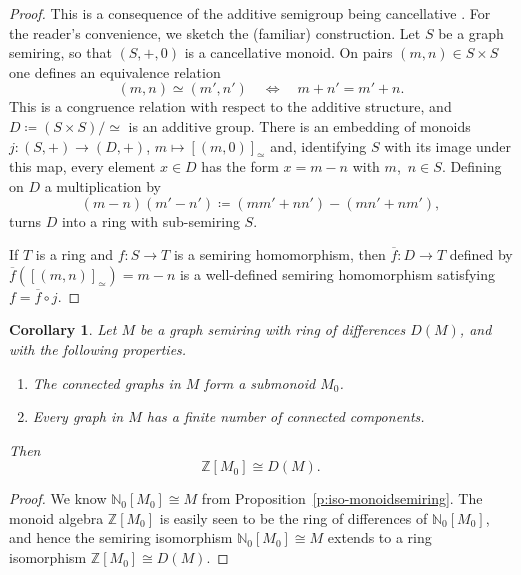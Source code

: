 \documentclass{amsart}
\theoremstyle{plain}
\newtheorem{corollary}[thm]{Corollary}
\theoremstyle{definition}
\newcommand{\bN}{\mathbb N}
\newcommand{\bZ}{\mathbb Z}
\newcommand{\diff}{D}
\begin{document}
\begin{proof}
  This is a consequence of the additive semigroup being cancellative \cite[Theorem II.5.11]{hebisch-weinert98}.
  For the reader's convenience, we sketch the (familiar) construction.
  Let $S$ be a graph semiring, so that $(S,+,0)$ is a cancellative monoid.
  On pairs $(m,n) \in S \times S$ one defines an equivalence relation
  \[
    (m,n) \simeq (m',n') \quad\Leftrightarrow\quad m + n' = m' + n.
  \]
  This is a congruence relation with respect to the additive structure, and $D \coloneqq (S \times S)/\!\simeq$ is an additive group.
  There is an embedding of monoids $j\colon (S,+) \rightarrow (D,+)$, $m \mapsto [(m,0)]_{\simeq}$ and, identifying $S$ with its image under this map, every element $x \in D$ has the form $x = m - n$ with $m$,~$n \in S$.
  Defining on $D$ a multiplication by
  \[
    (m - n)(m' - n') \coloneqq (mm' + nn') - (mn' + nm'),
  \]
  turns $D$ into a ring with sub-semiring $S$.

  If $T$ is a ring and $f\colon S \to T$ is a semiring homomorphism, then $\overline f \colon D \to T$ defined by $\overline f([(m,n)]_{\simeq}) = m - n$ is a well-defined semiring homomorphism satisfying $f = \overline{f} \circ j$.
\end{proof}

\begin{corollary} \label{c:iso-monoidalgebra}
  Let $M$ be a graph semiring with ring of differences $\diff(M)$, and with the following properties.
  \begin{enumerate}
  \item \label{isomonoid:submonoid} The connected graphs in $M$ form a submonoid $M_0$.
  \item \label{isomonoid:span} Every graph in $M$ has a finite number of connected components.
  \end{enumerate}
  Then
  \[
    \bZ[M_0] \cong \diff(M).
  \]
\end{corollary}

\begin{proof}
  We know $\bN_0[M_0] \cong M$ from Proposition~\ref{p:iso-monoidsemiring}.
  The monoid algebra $\bZ[M_0]$ is easily seen to be the ring of differences of $\bN_0[M_0]$, and hence the semiring isomorphism $\bN_0[M_0] \cong M$ extends to a ring isomorphism $\bZ[M_0] \cong D(M)$.
\end{proof}
\end{document}
